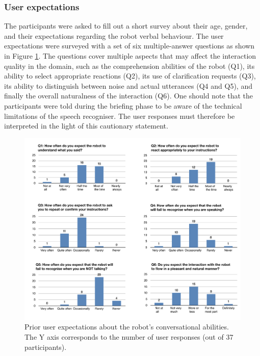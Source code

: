 \subsubsection*{User expectations}

The participants were asked to fill out a short survey about their age, gender, and their expectations regarding the robot verbal behaviour. The user expectations were surveyed with a set of six multiple-answer questions as shown in Figure \ref{fig:expectations}. The questions cover multiple aspects that may affect the interaction quality in the domain, such as the comprehension abilities of the robot (Q1), its ability to select appropriate reactions (Q2), its use of clarification requests (Q3), its ability to distinguish between noise and actual utterances (Q4 and Q5), and finally the overall naturalness of the interaction (Q6). One should note that the participants were told during the briefing phase to be aware of the technical limitations of the speech recogniser. The user responses must therefore be interpreted in the light of this cautionary statement. 


\begin{figure}[ht]
\begin{center}
\includegraphics[scale=0.5]{imgs/expectations.pdf}
\end{center} 
\caption{Prior user expectations about the robot's conversational abilities. The Y axis corresponds to the number of user responses (out of 37 participants). }
\label{fig:expectations}
\end{figure}

